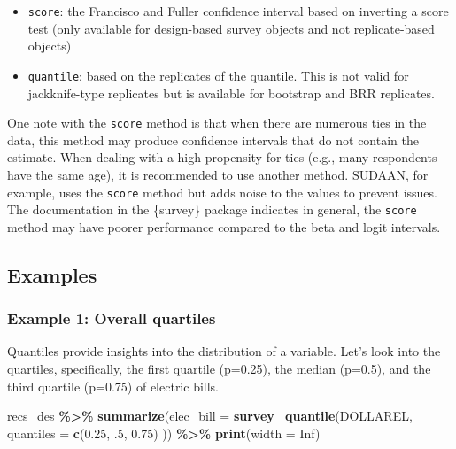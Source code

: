\documentclass[
]{krantz}
\makeatletter
\newenvironment{Shaded}{\begin{snugshade}}{\end{snugshade}}
\newcommand{\AttributeTok}[1]{\textcolor[rgb]{0.27,0.27,0.27}{#1}}
\newcommand{\ConstantTok}[1]{\textcolor[rgb]{0.37,0.37,0.37}{#1}}
\newcommand{\DecValTok}[1]{\textcolor[rgb]{0.06,0.06,0.06}{#1}}
\newcommand{\FloatTok}[1]{\textcolor[rgb]{0.06,0.06,0.06}{#1}}
\newcommand{\FunctionTok}[1]{\textcolor[rgb]{0.27,0.27,0.27}{\textbf{#1}}}
\newcommand{\NormalTok}[1]{#1}
\newcommand{\SpecialCharTok}[1]{\textcolor[rgb]{0.43,0.43,0.43}{\textbf{#1}}}
\providecommand{\tightlist}{%
  \setlength{\itemsep}{0pt}\setlength{\parskip}{0pt}}
\newenvironment{kframe}{%
\medskip{}
\setlength{\fboxsep}{.8em}
 \def\at@end@of@kframe{}%
 \ifinner\ifhmode%
  \def\at@end@of@kframe{\end{minipage}}%
  \begin{minipage}{\columnwidth}%
 \fi\fi%
 \def\FrameCommand##1{\hskip\@totalleftmargin \hskip-\fboxsep
 \colorbox{shadecolor}{##1}\hskip-\fboxsep
     \hskip-\linewidth \hskip-\@totalleftmargin \hskip\columnwidth}%
 \MakeFramed {\advance\hsize-\width
   \@totalleftmargin\z@ \linewidth\hsize
   \@setminipage}}%
 {\par\unskip\endMakeFramed%
 \at@end@of@kframe}
\renewenvironment{Shaded}{\begin{kframe}}{\end{kframe}}
\makeatother
\begin{document}
\begin{itemize}
\tightlist
\item
  \texttt{score}: the Francisco and Fuller confidence interval based on inverting a score test (only available for design-based survey objects and not replicate-based objects)
\item
  \texttt{quantile}: based on the replicates of the quantile. This is not valid for jackknife-type replicates but is available for bootstrap and BRR replicates.
\end{itemize}

One note with the \texttt{score} method is that when there are numerous ties in the data, this method may produce confidence intervals that do not contain the estimate. When dealing with a high propensity for ties (e.g., many respondents have the same age), it is recommended to use another method. SUDAAN, for example, uses the \texttt{score} method but adds noise to the values to prevent issues. The documentation in the \{survey\} package indicates in general, the \texttt{score} method may have poorer performance compared to the beta and logit intervals.

\hypertarget{examples-3}{%
\subsection{Examples}\label{examples-3}}

\hypertarget{example-1-overall-quartiles}{%
\subsubsection*{Example 1: Overall quartiles}\label{example-1-overall-quartiles}}


Quantiles provide insights into the distribution of a variable. Let's look into the quartiles, specifically, the first quartile (p=0.25), the median (p=0.5), and the third quartile (p=0.75) of electric bills.

\begin{Shaded}
\begin{Highlighting}[]
\NormalTok{recs\_des }\SpecialCharTok{\%\textgreater{}\%}
  \FunctionTok{summarize}\NormalTok{(}\AttributeTok{elec\_bill =} \FunctionTok{survey\_quantile}\NormalTok{(DOLLAREL,}
    \AttributeTok{quantiles =} \FunctionTok{c}\NormalTok{(}\FloatTok{0.25}\NormalTok{, .}\DecValTok{5}\NormalTok{, }\FloatTok{0.75}\NormalTok{)}
\NormalTok{  )) }\SpecialCharTok{\%\textgreater{}\%}
  \FunctionTok{print}\NormalTok{(}\AttributeTok{width =} \ConstantTok{Inf}\NormalTok{)}
\end{Highlighting}
\end{Shaded}
\end{document}
